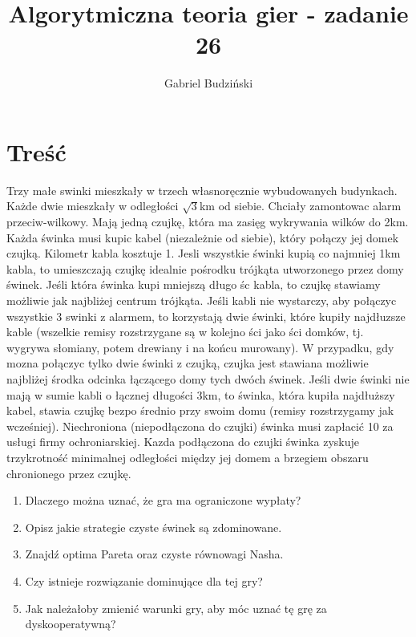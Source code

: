 \documentclass{article}
\title{Algorytmiczna teoria gier {-} zadanie 26}
\author{Gabriel Budziński}
\begin{document}
\maketitle

\section{Treść}

Trzy małe swinki mieszkały w trzech własnoręcznie wybudowanych budynkach. Każde dwie mieszkały w odległości $\sqrt{3}$km od siebie. Chciały zamontowac alarm przeciw-wilkowy. Mają jedną czujkę, która ma zasięg wykrywania wilków do 2km. Każda świnka musi kupic kabel (niezależnie od siebie), który połączy jej domek czujką. Kilometr kabla kosztuje 1. Jesli wszystkie świnki kupią co najmniej 1km kabla, to umieszczają czujkę idealnie pośrodku trójkąta utworzonego przez domy świnek. Jeśli która świnka kupi mniejszą długo śc kabla, to czujkę stawiamy możliwie jak najbliżej centrum trójkąta. Jeśli kabli nie wystarczy, aby połączyc wszystkie 3 swinki z alarmem, to korzystają dwie świnki, które kupiły najdłuzsze kable (wszelkie remisy rozstrzygane są w kolejno ści jako ści domków, tj. wygrywa słomiany, potem drewiany i na końcu murowany). W przypadku, gdy mozna połączyc tylko dwie świnki z czujką, czujka jest stawiana możliwie najbliżej środka odcinka łączącego domy tych dwóch świnek. Jeśli dwie świnki nie mają w sumie kabli o łącznej długości 3km, to świnka, która kupiła najdłuższy kabel, stawia czujkę bezpo średnio przy swoim domu (remisy rozstrzygamy jak wcześniej). Niechroniona (niepodłączona do czujki) świnka musi zapłacić 10 za usługi firmy ochroniarskiej. Kazda podłączona do czujki świnka zyskuje trzykrotność minimalnej odległości między jej domem a brzegiem obszaru chronionego przez czujkę.

\renewcommand{\labelenumi}{\alph{enumi})}
\begin{enumerate}
    \item Dlaczego można uznać, że gra ma ograniczone wypłaty?
    \item Opisz jakie strategie czyste świnek są zdominowane.
    \item Znajdź optima Pareta oraz czyste równowagi Nasha.
    \item Czy istnieje rozwiązanie dominujące dla tej gry?
    \item Jak należałoby zmienić warunki gry, aby móc uznać tę grę za dyskooperatywną?
\end{enumerate}
\end{document}
